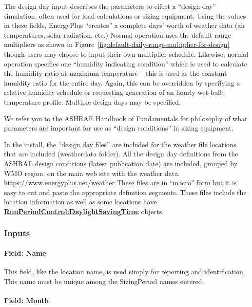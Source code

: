 The design day input describes the parameters to effect a ``design day'' simulation, often used for load calculations or sizing equipment. Using the values in these fields, EnergyPlus ``creates'' a complete days' worth of weather data (air temperatures, solar radiation, etc.) Normal operation uses the default range multipliers as shown in Figure~\ref{fig:default-daily-range-multiplier-for-design} though users may choose to input their own multiplier schedule. Likewise, normal operation specifies one ``humidity indicating condition'' which is used to calculate the humidity ratio at maximum temperature -- this is used as the constant humidity ratio for the entire day. Again, this can be overridden by specifying a relative humidity schedule or requesting generation of an hourly wet-bulb temperature profile. Multiple design days may be specified.

We refer you to the ASHRAE Handbook of Fundamentals for philosophy of what parameters are important for use as ``design conditions'' in sizing equipment.

\begin{callout}
  In the install, the ``design day files'' are included for the weather file locations that are included (weatherdata folder). All the design day definitions from the ASHRAE design conditions (latest publication date) are included, grouped by WMO region, on the main web site with the weather data. \url{https://www.energyplus.net/weather} These files are in ``macro'' form but it is easy to cut and paste the appropriate definition segments. These files include the location information as well as some locations have \textbf{\hyperref[runperiodcontroldaylightsavingtime]{RunPeriodControl:DaylightSavingTime}} objects.
\end{callout}

\subsubsection{Inputs}\label{inputs-1-024}

\paragraph{Field: Name}\label{field-name-1-023}

This field, like the location name, is used simply for reporting and identification. This name must be unique among the SizingPeriod names entered.

\paragraph{Field: Month}\label{field-month}

